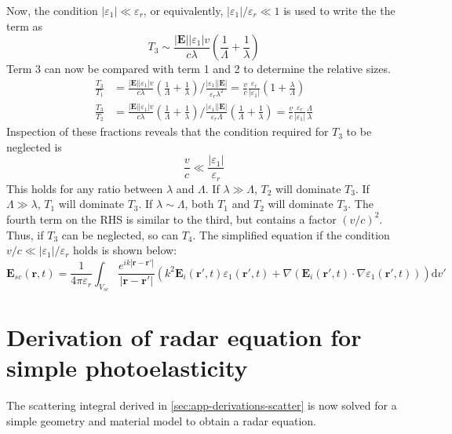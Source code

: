 \documentclass[10pt,a4paper]{eitExjobb}
\begin{document}
	Now, the condition $|\varepsilon_1| \ll \varepsilon_r$, or equivalently, $|\varepsilon_1|/\varepsilon_r \ll 1$ is used to write the the term as
	\begin{equation*}
	T_3 \sim \frac{|\bm{E}| |\varepsilon_1| v}{c\lambda} \left( \frac{1}{\Lambda} + \frac{1}{\lambda} \right)
	\end{equation*}
	Term 3 can now be compared with term 1 and 2 to determine the relative sizes.
	\begin{align*}
	\frac{T_3}{T_1} &= \frac{|\bm{E}| |\varepsilon_1| v}{c\lambda} \left( \frac{1}{\Lambda} + \frac{1}{\lambda} \right)
	\bigg/
	\frac{|\varepsilon_1| |\bm{E}|}{\varepsilon_r \lambda^2} =
	\frac{v}{c} \frac{\varepsilon_r}{|\varepsilon_1|} \left( 1 + \frac{\lambda}{\Lambda} \right) \\
	\frac{T_3}{T_2} &= \frac{|\bm{E}| |\varepsilon_1| v}{c\lambda} \left( \frac{1}{\Lambda} + \frac{1}{\lambda} \right)
	\bigg/
	\frac{|\varepsilon_1| |\bm{E}|}{\varepsilon_r \Lambda} \left( \frac{1}{\Lambda} + \frac{1}{\lambda} \right) =
	\frac{v}{c} \frac{\varepsilon_r}{|\varepsilon_1|} \frac{\Lambda}{\lambda}
	\end{align*}
	Inspection of these fractions reveals that the condition required for $T_3$ to be neglected is
	\begin{equation*}
	\frac{v}{c} \ll \frac{|\varepsilon_1|}{\varepsilon_r}
	\end{equation*}
	This holds for any ratio between $\lambda$ and $\Lambda$. If $\lambda \gg \Lambda$, $T_2$ will dominate $T_3$. If $\Lambda \gg \lambda$, $T_1$ will dominate $T_3$. If $\lambda \sim \Lambda$, both $T_1$ and $T_2$ will dominate $T_3$. The fourth term on the RHS is similar to the third, but contains a factor $(v/c)^2$. Thus, if $T_3$ can be neglected, so can $T_4$.	The simplified equation if the condition $v/c \ll |\varepsilon_1|/\varepsilon_r$ holds is shown below:
	\begin{equation*}
	\boxed{
		\bm{E}_{sc}(\bm{r},t) = \frac{1}{4\pi\varepsilon_r} \int_{V_{sc}} \frac{e^{ik |\bm{r}-\bm{r'}| }}{ |\bm{r}-\bm{r'}|} \left( k^2 \bm{E}_i (\bm{r'},t) \varepsilon_1 (\bm{r'},t) + \nabla (\bm{E}_i (\bm{r'},t) \cdot \nabla \varepsilon_1 (\bm{r'},t)) \right) \mathrm{d}v'
	}
	\end{equation*}
	
	\section{Derivation of radar equation for simple photoelasticity \label{sec:app-derivations-radar}}
	The scattering integral derived in \ref{sec:app-derivations-scatter} is now solved for a simple geometry and material model to obtain a radar equation.
	
\end{document}
